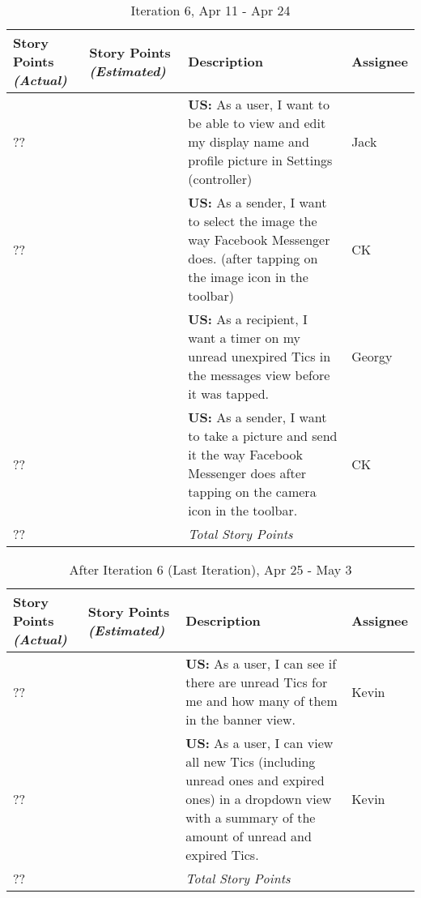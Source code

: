 \clearpage
\begin{table}[H]
	\centering
	\caption{Iteration 6, Apr 11 - Apr 24}
	 \renewcommand{\arraystretch}{1.2}
	\begin{tabular}{>{\centering\arraybackslash}m{2.3cm} >{\centering\arraybackslash}m{2.3cm} | m{7cm} m{1.6cm} }
		\toprule
		Story Points \textit{(Actual)} & Story Points \textit{(Estimated)} & Description & Assignee\\
		\midrule
		?? 	& 5 	& \textbf{US:} As a user, I want to be able to view and edit my display name and profile picture in Settings (controller) & Jack\\
		?? 	& 5 	& \textbf{US:} As a sender, I want to select the image the way Facebook Messenger does. (after tapping on the image icon in the toolbar) & CK\\
		5 	& 3 	& \textbf{US:} As a recipient, I want a timer on my unread unexpired Tics in the messages view before it was tapped. & Georgy\\
 		?? 	& 5 	& \textbf{US:} As a sender, I want to take a picture and send it the way Facebook Messenger does after tapping on the camera icon in the toolbar. & CK\\
 		\midrule
		?? 	& 18 	& \textit{Total Story Points} &\\
		\bottomrule
	\end{tabular}
\end{table}

\clearpage
\begin{table}[H]
	\centering
	\caption{After Iteration 6 (Last Iteration), Apr 25 - May 3}
	 \renewcommand{\arraystretch}{1.2}
	\rowcolors{2}{white}{gray!20}
	\begin{tabular}{>{\centering\arraybackslash}m{2.3cm} >{\centering\arraybackslash}m{2.3cm} | m{7cm} m{1.6cm} }
		\toprule
		Story Points \textit{(Actual)} & Story Points \textit{(Estimated)} & Description & Assignee\\
		\midrule
		??	& 12 & \textbf{US:} As a user, I can see if there are unread Tics for me and how many of them in the banner view. & Kevin\\
		??	& 12 & \textbf{US:} As a user, I can view all new Tics (including unread ones and expired ones) in a dropdown view with a summary of the amount of unread and expired Tics. & Kevin\\
 		\midrule
		?? 	& 24 	& \textit{Total Story Points} &\\
		\bottomrule
	\end{tabular}
\end{table}

